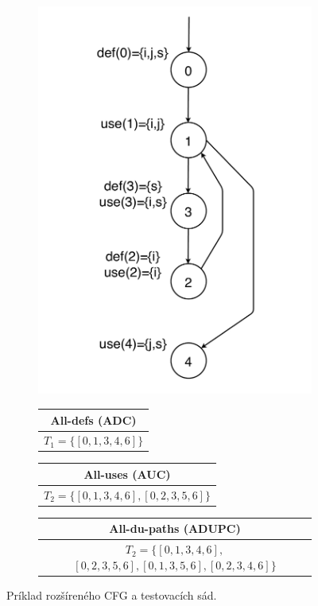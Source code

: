 \begin{figure}[H]
	\begin{subfigure}{0.5\linewidth}
		\centering
		\includegraphics[width=0.8\linewidth]{obrazky/cfg_def_use.pdf}
	\end{subfigure}
	\begin{subfigure}{0.5\linewidth}
		\centering
		\begin{tabular}{ |c| } 
			\hline
			All-defs (ADC) \\
			\hline
			$T_1 = \{[0, 1, 3, 4, 6]\}$ \\
			\hline
		\end{tabular}
		\bigskip

		\begin{tabular}{ |c| } 
			\hline
			All-uses (AUC) \\
			\hline
			$T_2 = \{[0, 1, 3, 4, 6], [0, 2, 3, 5, 6]\}$ \\
			\hline
		\end{tabular}
		\bigskip

		\begin{tabular}{ |c| } 
			\hline
			All-du-paths (ADUPC) \\
			\hline
			$T_2 = \{[0, 1, 3, 4, 6],$ \newline$[0, 2, 3, 5, 6], [0, 1, 3, 5, 6], [0, 2, 3, 4, 6]\}$ \\
			\hline
		\end{tabular}
	\end{subfigure}
	\caption{Príklad rozšíreného CFG a testovacích sád.}
\end{figure}

